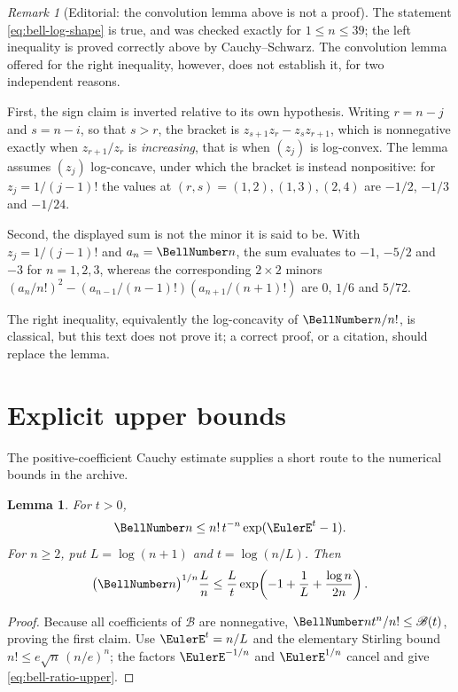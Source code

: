 \documentclass[11pt,a4paper,oneside,openany]{book}
\newtheorem{lemma}[theorem]{Lemma}
\theoremstyle{definition}
\theoremstyle{remark}
\newtheorem{remark}[theorem]{Remark}
\begin{document}
\begin{remark}[Editorial: the convolution lemma above is not a proof]
The statement \eqref{eq:bell-log-shape} is true, and was checked exactly for
$1\le n\le39$; the left inequality is proved correctly above by
Cauchy--Schwarz.  The convolution lemma offered for the right inequality,
however, does not establish it, for two independent reasons.

First, the sign claim is inverted relative to its own hypothesis.  Writing
$r=n-j$ and $s=n-i$, so that $s>r$, the bracket is
$z_{s+1}z_r-z_sz_{r+1}$, which is nonnegative exactly when
$z_{r+1}/z_r$ is \emph{increasing}, that is when $(z_j)$ is log-convex.  The
lemma assumes $(z_j)$ log-concave, under which the bracket is instead
nonpositive: for $z_j=1/(j-1)!$ the values at $(r,s)=(1,2),(1,3),(2,4)$ are
$-1/2$, $-1/3$ and $-1/24$.

Second, the displayed sum is not the minor it is said to be.  With
$z_j=1/(j-1)!$ and $a_n=\BellNumber n$, the sum evaluates to $-1$, $-5/2$ and
$-3$ for $n=1,2,3$, whereas the corresponding $2\times2$ minors
$(a_n/n!)^2-(a_{n-1}/(n-1)!)(a_{n+1}/(n+1)!)$ are $0$, $1/6$ and $5/72$.

The right inequality, equivalently the log-concavity of $\BellNumber n/n!$, is
classical, but this text does not prove it; a correct proof, or a citation,
should replace the lemma.
\end{remark}

\section{Explicit upper bounds}
The positive-coefficient Cauchy estimate supplies a short route to the numerical
bounds in the archive.
\begin{lemma}\label{lem:bell-coeff-upper}
For $t>0$,
\begin{equation}\label{eq:bell-coeff-upper}
 \BellNumber n\le n!\,t^{-n}\exp(\EulerE^t-1).
\end{equation}
For $n\ge2$, put $L=\log(n+1)$ and $t=\log(n/L)$.  Then
\begin{equation}\label{eq:bell-ratio-upper}
 \bigl(\BellNumber n\bigr)^{1/n}\frac{L}{n}
 \le \frac{L}{t}
 \exp\!\left(-1+\frac1L+\frac{\log n}{2n}\right).
\end{equation}
\end{lemma}
\begin{proof}
Because all coefficients of $\mathscr B$ are nonnegative,
$\BellNumber n t^n/n!\le\mathscr B(t)$, proving the first claim.  Use
$\EulerE^t=n/L$ and the elementary Stirling bound
$n!\le e\sqrt n\,(n/e)^n$; the factors $\EulerE^{-1/n}$ and $\EulerE^{1/n}$ cancel and give
\eqref{eq:bell-ratio-upper}.
\end{proof}
\end{document}
